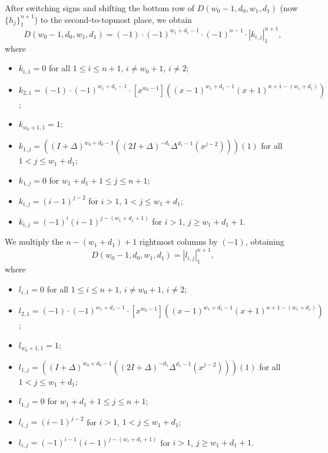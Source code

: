 \documentclass[10pt,reqno]{amsart}
\theoremstyle{plain}
\theoremstyle{definition}
\theoremstyle{remark}
\def\determinant#1{\left|#1\right|}
\begin{document}
After switching signs and shifting the bottom row of
$D(w_0-1,d_0,w_1,d_1)$ (now  $\{h_j\}_1^{n+1}$) to the second-to-topmost
place, we obtain
\begin{equation}
D(w_0-1,d_0,w_1,d_1) = 
(-1)\cdot (-1)^{w_1+d_1-1}\cdot (-1)^{n-1}\cdot
\determinant{k_{i,j}}_1^{n+1},
\end{equation}
where 
\begin{itemize}
\item $k_{i,1} = 0$ for all $1\leq i\leq n+1$, $i\ne w_0+1$, $i\ne 2$;
\item $k_{2,1} = (-1)\cdot (-1)^{w_1+d_1-1}\cdot
[x^{w_0-1}]((x-1)^{w_1+d_1-1} (x+1)^{n+1-(w_1+d_1)})$;
\item $k_{w_0+1,1} = 1$;
\item $k_{1,j} = 
((I+\Delta)^{w_0+d_0-1}((2I+\Delta)^{-d_1}\Delta^{d_1-1}(x^{j-2})))(1)$
for all $1<j\leq w_1+d_1$;
\item $k_{1,j} = 0$ for $w_1+d_1+1\leq j\leq n+1$;
\item $k_{i,j} = (i-1)^{j-2}$ for $i>1$, $1<j\leq w_1+d_1$;
\item $k_{i,j} = (-1)^i (i-1)^{j-(w_1+d_1+1)}$ for $i>1$, $j\geq w_1+d_1+1$.
\end{itemize}

We multiply the $n-(w_1+d_1)+1$ rightmost columns by $(-1)$, obtaining
\begin{equation}
D(w_0-1,d_0,w_1,d_1) = \determinant{l_{i,j}}_1^{n+1},
\end{equation}
where
\begin{itemize}
\item $l_{i,1} = 0$ for all $1\leq i\leq n+1$, $i\ne w_0+1$, $i\ne 2$;
\item $l_{2,1} = (-1)\cdot (-1)^{w_1+d_1-1}\cdot
[x^{w_0-1}]((x-1)^{w_1+d_1-1} (x+1)^{n+1-(w_1+d_1)})$;
\item $l_{w_0+1,1} = 1$;
\item $l_{1,j} = 
((I+\Delta)^{w_0+d_0-1}((2I+\Delta)^{-d_1}\Delta^{d_1-1}(x^{j-2})))(1)$
for all $1<j\leq w_1+d_1$;
\item $l_{1,j} = 0$ for $w_1+d_1+1\leq j\leq n+1$;
\item $l_{i,j} = (i-1)^{j-2}$ for $i>1$, $1<j\leq w_1+d_1$;
\item $l_{i,j} = (-1)^{i-1} (i-1)^{j-(w_1+d_1+1)}$ for $i>1$, $j\geq w_1+d_1+1$.
\end{itemize}
\end{document}
